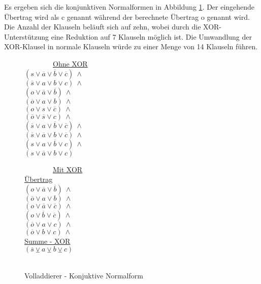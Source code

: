 Es ergeben sich die konjunktiven Normalformen in Abbildung \ref{fig:fulladder_cnf}. Der eingehende Übertrag wird als c genannt während der
berechnete Übertrag o genannt wird. Die Anzahl der Klauseln beläuft sich auf zehn, wobei durch die XOR-Unterstützung
eine Reduktion auf 7 Klauseln möglich ist. Die Umwandlung der XOR-Klausel in normale Klauseln würde zu einer Menge von 14 Klauseln führen.
\begin{figure}[!h]
  \centering
  \begin{minipage}[l]{5cm}
    ~~~~~~~~\underline{Ohne XOR}\\
    $ (s \vee \overline{a} \vee \overline{b} \vee \overline{c}) ~ \wedge $\\
    $ (\overline{s} \vee a \vee b \vee c) ~ \wedge $\\
    $ (o \vee \overline{a} \vee \overline{b}) ~ \wedge $\\
    $ (\overline{o} \vee a \vee b) ~ \wedge $\\
    $ (o \vee s \vee \overline{c}) ~ \wedge $\\
    $ (\overline{o} \vee \overline{s} \vee c) ~ \wedge $\\
    $ (\overline{s} \vee a \vee \overline{b} \vee \overline{c}) ~ \wedge $\\
    $ (\overline{s} \vee \overline{a} \vee b \vee \overline{c}) ~ \wedge $\\
    $ (s \vee a \vee \overline{b} \vee c) ~ \wedge $\\
    $ (s \vee \overline{a} \vee b \vee c) $
  \end{minipage}
  \begin{minipage}[l]{5cm}
    ~~~~~~~~\underline{Mit XOR}\\
    \underline{Übertrag}\\
    $ (o \vee \overline{a} \vee \overline{b}) ~ \wedge $\\
    $ (\overline{o} \vee a \vee b) ~ \wedge $\\
    $ (o \vee \overline{a} \vee \overline{c}) ~ \wedge $\\
    $ (o \vee \overline{b} \vee \overline{c}) ~ \wedge $\\
    $ (\overline{o} \vee a \vee c) ~ \wedge $\\
    $ (\overline{o} \vee b \vee c) ~ \wedge $\\
    \underline{Summe - XOR}\\
    $ (\overline{s} \veebar a \veebar b \veebar c) $\\
    ~
  \end{minipage}
  \caption{Volladdierer - Konjuktive Normalform}
  \label{fig:fulladder_cnf}
\end{figure}

